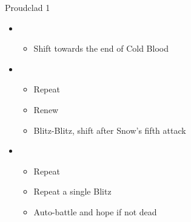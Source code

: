 \begin{battle}[1:31]{Proudclad 1}
\begin{itemize}
\begin{itemize}
		      \end{itemize}
		\item \sixth
		      \begin{itemize}
			      \item Shift towards the end of Cold Blood
		      \end{itemize}
		\item \first
		      \begin{itemize}
			      \item Repeat
			      \item Renew
			      \item Blitz-Blitz, shift after Snow's fifth attack
		      \end{itemize}
		\item \second
		      \begin{itemize}
			      \item Repeat
			      \item Repeat a single Blitz
			      \item Auto-battle and hope if not dead
		      \end{itemize}
	\end{itemize}
\end{battle}
\vfill

